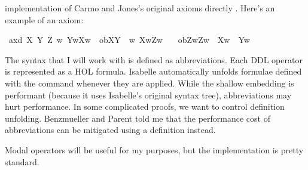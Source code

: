 \begin{isabellebody}
\begin{isamarkuptext}
implementation of Carmo and Jones's original axioms directly \citep{BFP}. Here's an example of an axiom:%
\end{isamarkuptext}\isamarkuptrue%
\isanewline
{}\ ax{\isacharunderscore}{}d{\isacharcolon}\ {\isachardoublequoteopen}{\isasymforall}X\ Y\ Z{\isachardot}\ {\isacharparenleft}{\isacharparenleft}{\isasymforall}w{\isachardot}\ Y{\isacharparenleft}w{\isacharparenright}{\isasymlongrightarrow}X{\isacharparenleft}w{\isacharparenright}{\isacharparenright}\ {\isasymand}\ ob{\isacharparenleft}X{\isacharparenright}{\isacharparenleft}Y{\isacharparenright}\ {\isasymand}\ {\isacharparenleft}{\isasymforall}w{\isachardot}\ X{\isacharparenleft}w{\isacharparenright}{\isasymlongrightarrow}Z{\isacharparenleft}w{\isacharparenright}{\isacharparenright}{\isacharparenright}\ \isanewline
\ \ {\isasymlongrightarrow}ob{\isacharparenleft}Z{\isacharparenright}{\isacharparenleft}{\isasymlambda}w{\isachardot}{\isacharparenleft}Z{\isacharparenleft}w{\isacharparenright}\ {\isasymand}\ {\isasymnot}X{\isacharparenleft}w{\isacharparenright}{\isacharparenright}\ {\isasymor}\ Y{\isacharparenleft}w{\isacharparenright}{\isacharparenright}{\isachardoublequoteclose}\isanewline
%
\isanewline
%
\isadelimdocument
%
\endisadelimdocument
%
\isatagdocument
%
\isamarkuptrue%
%
\endisatagdocument
{\isafolddocument}%
%
\isadelimdocument
%
\endisadelimdocument
%
\begin{isamarkuptext}%
The syntax that I will work with is defined as abbreviations. Each DDL operator is represented 
as a HOL formula. Isabelle automatically unfolds formulae defined with the  command 
whenever they are applied. While the shallow embedding is performant (because it uses Isabelle's original 
syntax tree), abbreviations may hurt performance. In some complicated proofs, we want to control definition
unfolding. Benzmueller and Parent told me that the performance cost of abbreviations can 
be mitigated using a definition instead.%
\end{isamarkuptext}\isamarkuptrue%
%
\begin{isamarkuptext}%
Modal operators will be useful for my purposes, but the implementation is pretty standard.%

\end{isamarkuptext}
\end{isabellebody}
